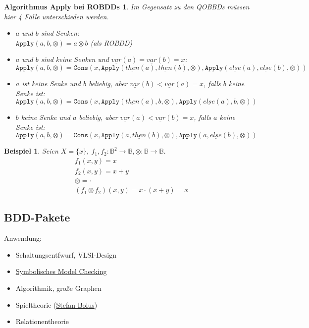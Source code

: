 \documentclass[ngerman]{scrartcl}
\theoremstyle{custom}
\newtheorem{mex}[mdef]{Beispiel}
\newtheorem{apply-robdd}[mdef]{Algorithmus Apply bei ROBDDs}
\newcommand{\0}{\mathbf{0}}
\newcommand{\1}{\mathbf{L}}
\newcommand{\then}{\underline{then}}
\newcommand{\el}{\underline{else}}
\newcommand{\var}{\underline{var}}
\begin{document}
\begin{apply-robdd}
Im Gegensatz zu den QOBBDs m\"ussen hier 4 F\"alle unterschieden
werden.
\begin{itemize}
\item[(1)] $a$ und $b$ sind Senken:\\ $\texttt{Apply}(a,b,\otimes) = a
  \otimes b$ (als ROBDD)
\item[(2)] $a$ und $b$ sind keine Senken und
  $\underline{var}(a)=\underline{var}(b)=x$:\\
$\texttt{Apply}(a,b,\otimes) =\texttt{Cons}(x,
\texttt{Apply}(\underline{then}(a), \underline{then}(b), \otimes),
\texttt{Apply}(\underline{else}(a), \underline{else}(b), \otimes))$
\item[(3)] $a$ ist keine Senke und $b$ beliebig, aber
  $\underline{var}(b) < \underline{var}(a) = x$, falls $b$ keine
  Senke ist:\\
$\texttt{Apply}(a,b,\otimes)=\texttt{Cons}(x,
\texttt{Apply}(\underline{then}(a), b, \otimes),
\texttt{Apply}(\underline{else}(a),b,\otimes))$
\item[(4)] $b$ keine Senke und $a$ beliebig, aber $\var(a) < \var(b)=x$,
  falls $a$ keine Senke ist:\\
$\texttt{Apply}(a,b,\otimes)=\texttt{Cons}(x,
\texttt{Apply}(a,\then(b), \otimes), \texttt{Apply}(a, \el(b), \otimes))$
\end{itemize}
\end{apply-robdd}

\begin{mex}
Seien $X=\{x\}, ~ f_1,f_2: \mathds{B}^2 \rightarrow \mathds{B},
\otimes: \mathds{B} \rightarrow \mathds{B}$.
\begin{align*}
&f_1(x,y) = x\\
&f_2(x,y) =  x + y\\
&\otimes = \cdot\\
&(f_1 \otimes f_2)(x,y) = x \cdot (x+y) = x
\end{align*}
\end{mex}

\subsection{BDD-Pakete}
Anwendung:
\begin{itemize}
\item[(1)] Schaltungsentfwurf, VLSI-Design
\item[(2)] \href{http://de.wikipedia.org/wiki/Model_Checking}{Symbolisches Model Checking}
\item[(3)] Algorithmik, gro\ss e Graphen
\item[(4)] Spieltheorie (\href{http://www.informatik.uni-kiel.de/~stb/}{Stefan Bolus})
\item[(5)] Relationentheorie
\end{itemize}
\end{document}
